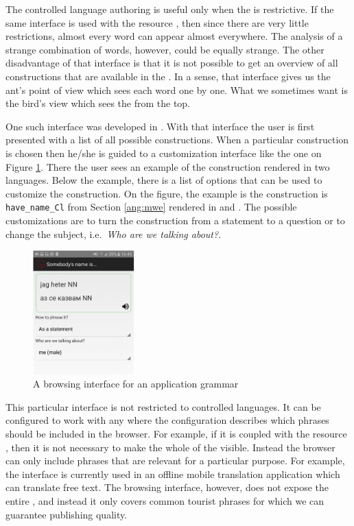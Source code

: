 \documentclass[output=paper]{langsci/langscibook}
\begin{document}
The controlled language authoring is useful only when the 
is restrictive. If the same interface is used with the resource ,
then since there are very little restrictions, almost every word can
appear almost everywhere. The analysis of a strange combination of words,
however, could be equally strange. The other disadvantage of that 
interface is that it is not possible to get an overview of 
all constructions that are available in the . In a sense, that
interface gives us the ant's point of view which sees each word
one by one. What we sometimes want is the bird's view which sees the
 from the top. 

One such interface was developed in \cite{parlira}. With that interface 
the user is first presented with a list of all possible constructions. 
When a particular construction is chosen then he/she is guided to 
a customization interface
like the one on Figure \ref{ang:fig:parlira}. There the user sees an example
of the construction rendered in two languages. Below the example,
there is a list of options that can be used to customize the construction.
On the figure, the example is the construction is \verb=have_name_Cl= from
Section \ref{ang:mwe} rendered in  and . The possible
customizations are to turn the construction from a statement to a question
or to change the subject, i.e.\ \textit{Who are we talking about?}.

\begin{figure}
\center
\includegraphics[width=0.35\textwidth]{figures/parlira1}
\caption{A browsing interface for an application grammar}
\label{ang:fig:parlira}
\end{figure}

This particular interface is not restricted to controlled languages.
It can be configured to work with any  where the configuration
describes which phrases should be included in the browser.
For example, if it is coupled with the resource , then it
is not necessary to make the whole of the  visible.
Instead the browser can only include phrases that are relevant
for a particular purpose. For example, the interface is currently used
in an offline mobile translation application \citep{angelov:android}
which can translate free text. The browsing interface, however,
does not expose the entire , and instead it only
covers common tourist phrases for which we can guarantee publishing
quality.
\end{document}

